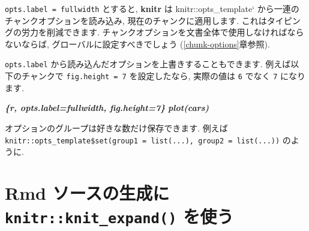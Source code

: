 \documentclass[
  11pt,
]{bxjsreport}
\newenvironment{Shaded}{\begin{snugshade}}{\end{snugshade}}
\newcommand{\InformationTok}[1]{\textcolor[rgb]{0.56,0.35,0.01}{\textbf{\textit{#1}}}}
\begin{document}
\begin{Shaded}
\end{Shaded}

\texttt{opts.label = \textquotesingle{}fullwidth\textquotesingle{}} とすると, \textbf{knitr} は knitr::opts\_template` から一連のチャンクオプションを読み込み, 現在のチャンクに適用します. これはタイピングの労力を削減できます. チャンクオプションを文書全体で使用しなければならないならば, グローバルに設定すべきでしょう (\ref{chunk-options}章参照).

\texttt{opts.label} から読み込んだオプションを上書きすることもできます. 例えば以下のチャンクで \texttt{fig.height = 7} を設定したなら, 実際の値は \texttt{6} でなく \texttt{7} になります.

\begin{Shaded}
\begin{Highlighting}[]
\InformationTok{\textasciigrave{}\textasciigrave{}\textasciigrave{}\{r, opts.label=\textquotesingle{}fullwidth\textquotesingle{}, fig.height=7\}}
\InformationTok{plot(cars)}
\InformationTok{\textasciigrave{}\textasciigrave{}\textasciigrave{}}
\end{Highlighting}
\end{Shaded}

オプションのグループは好きな数だけ保存できます. 例えば \texttt{knitr::opts\_template\$set(group1 = list(...), group2 = list(...))} のように.

\hypertarget{knit-expand}{%
\section{\texorpdfstring{Rmd ソースの生成に \texttt{knitr::knit\_expand()} を使う}{Rmd ソースの生成に knitr::knit\_expand() を使う}}\label{knit-expand}}
\end{document}

